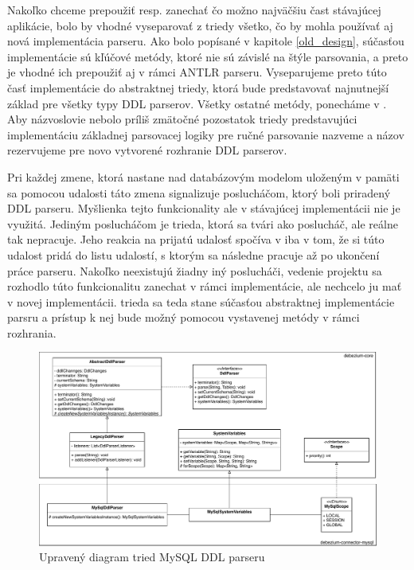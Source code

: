 Nakoľko chceme prepoužiť resp. zanechať čo možno najväčšiu čast stávajúcej aplikácie, bolo by vhodné vyseparovať z triedy  všetko, čo by mohla používať aj nová implementácia parseru. Ako bolo popísané v kapitole \ref{old_design}, súčasťou implementácie  sú kľúčové metódy, ktoré nie sú závislé na štýle parsovania, a preto je vhodné ich prepoužiť aj v rámci ANTLR parseru. Vyseparujeme preto túto časť implementácie do abstraktnej triedy, ktorá bude predstavovať najnutnejší základ pre všetky typy DDL parserov. Všetky ostatné metódy, ponecháme v . Aby názvoslovie nebolo príliš zmätočné pozostatok triedy  predstavujúci implementáciu základnej parsovacej logiky pre ručné parsovanie nazveme  a názov  rezervujeme pre novo vytvorené rozhranie DDL parserov.

Pri každej zmene, ktorá nastane nad databázovým modelom uloženým v pamäti sa pomocou udalosti táto zmena signalizuje poslucháčom, ktorý boli priradený DDL parseru. Myšlienka tejto funkcionality ale v stávajúcej implementácii nie je využitá. Jediným poslucháčom je  trieda, ktorá sa tvári ako poslucháč, ale reálne tak nepracuje. Jeho reakcia na prijatú udalosť spočíva v iba v tom, že si túto udalost pridá do listu udalostí, s ktorým sa následne pracuje až po ukončení práce parseru. Nakoľko neexistujú žiadny iný poslucháči, vedenie projektu sa rozhodlo túto funkcionalitu zanechat v rámci  implementácie, ale nechcelo ju mať v novej implementácii.  trieda sa teda stane súčasťou abstraktnej implementácie parsru a prístup k nej bude možný pomocou vystavenej metódy v rámci  rozhrania.

\begin{figure}[H]
\begin{center}
\includegraphics[width=15cm]{figures/New_design.pdf}
\caption{Upravený diagram tried MySQL DDL parseru}
\label{fig:class_diagram_new}
\end{center}
\end{figure}

